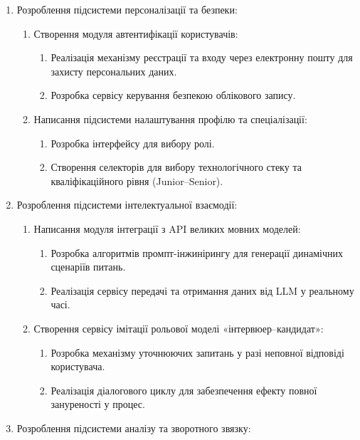 \documentclass[
]{article}
\begin{document}
\begin{enumerate}
\def\labelenumi{\arabic{enumi}.}
\item
  Розроблення підсистеми персоналізації та безпеки:

  \begin{enumerate}
  \def\labelenumii{\arabic{enumii}.}
  \item
    Створення модуля автентифікації користувачів:

    \begin{enumerate}
    \def\labelenumiii{\arabic{enumiii}.}
    \item
      Реалізація механізму реєстрації та входу через електронну пошту
      для захисту персональних даних.
    \item
      Розробка сервісу керування безпекою облікового запису.
    \end{enumerate}
  \item
    Написання підсистеми налаштування профілю та спеціалізації:

    \begin{enumerate}
    \def\labelenumiii{\arabic{enumiii}.}
    \item
      Розробка інтерфейсу для вибору ролі.
    \item
      Створення селекторів для вибору технологічного стеку та
      кваліфікаційного рівня (Junior--Senior).
    \end{enumerate}
  \end{enumerate}
\item
  Розроблення підсистеми інтелектуальної взаємодії:

  \begin{enumerate}
  \def\labelenumii{\arabic{enumii}.}
  \item
    Написання модуля інтеграції з API великих мовних моделей:

    \begin{enumerate}
    \def\labelenumiii{\arabic{enumiii}.}
    \item
      Розробка алгоритмів промпт-інжинірингу для генерації динамічних
      сценаріїв питань.
    \item
      Реалізація сервісу передачі та отримання даних від LLM у реальному
      часі.
    \end{enumerate}
  \item
    Створення сервісу імітації рольової моделі
    «інтерв\textquotesingle юер--кандидат»:

    \begin{enumerate}
    \def\labelenumiii{\arabic{enumiii}.}
    \item
      Розробка механізму уточнюючих запитань у разі неповної відповіді
      користувача.
    \item
      Реалізація діалогового циклу для забезпечення ефекту повної
      зануреності у процес.
    \end{enumerate}
  \end{enumerate}
\item
  Розроблення підсистеми аналізу та зворотного зв\textquotesingle язку:


\end{enumerate}
\end{document}
